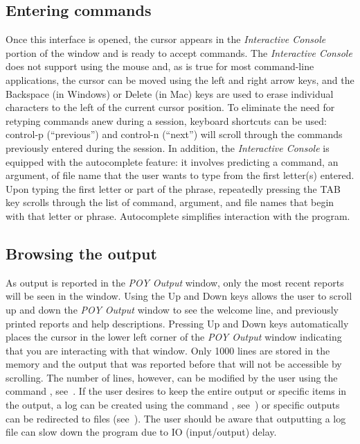 {\subsection{Entering commands}
Once this \poy interface is opened, the cursor appears in the
\emph{Interactive Console} portion of the window and is ready to
accept commands. The \emph{Interactive Console} does not support
using the mouse and, as is true for most command-line applications,
the cursor can be moved using the left and right arrow keys, and
the Backspace (in Windows) or Delete (in Mac) keys are used to erase
individual characters to the left of the current cursor position.
To eliminate the need for retyping commands anew during a \poy
session, keyboard shortcuts can be used: control-p (``previous'')
and control-n (``next'') will scroll through the commands previously
entered during the session. In addition, the \emph{Interactive
Console} is equipped with the autocomplete feature: it involves
\poy predicting a command, an argument, of file name that the user
wants to type from the first letter(s) entered. Upon typing the
first letter or part of the phrase, repeatedly pressing the TAB key
scrolls through the list of command, argument, and file names that
begin with that letter or phrase. Autocomplete simplifies interaction
with the program.

\subsection{Browsing the output}
As output is reported in the \emph{POY Output} window, only the
most recent reports will be seen in the window.  Using the Up and
Down keys allows the user to scroll up and down the \emph{POY Output}
window to see the welcome line, and previously printed reports and
help descriptions. Pressing Up and Down keys automatically places
the cursor in the lower left corner of the \emph{POY Output} window
indicating that you are interacting with that window. Only 1000
lines are stored in the memory and the output that was reported
before that will not be accessible by scrolling. The number of
lines, however, can be modified by the user using the command
, see~. If the user desires to
keep the entire output or specific items in the output, a log can
be created using the command , see~)
or specific outputs can be redirected to files (see~).
The user should be aware that outputting a log file can slow down
the program due to IO (input/output) delay.

}
